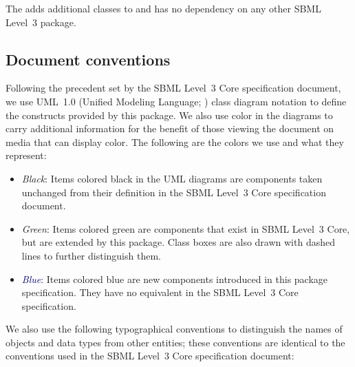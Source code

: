 The \FBCPackage adds additional classes to \sbmlthreecore and has no 
dependency on any other SBML Level~3 package. 


\subsection{Document conventions} \label{conventions} 

Following the precedent set by the SBML Level~3 Core specification 
document, we use UML~1.0 (Unified Modeling Language; 
\citealt{eriksson:1998,oestereich:1999}) class diagram notation to 
define the constructs provided by this package. We also use color in the 
diagrams to carry additional information for the benefit of those 
viewing the document on media that can display color. The following are 
the colors we use and what they represent: 

\begin{itemize} 

\item[\raisebox{2.75pt}{\colorbox{black}{\rule{0.8pt}{0.8pt}}}] 
\emph{Black}: Items colored black in the UML diagrams are components 
taken unchanged from their definition in the SBML Level~3 Core 
specification document. 

\item[\raisebox{2.75pt}{\colorbox{mediumgreen}{\rule{0.8pt}{0.8pt}}}] 
\emph{\textcolor{mediumgreen}{Green}}: Items colored green are 
components that exist in SBML Level~3 Core, but are extended by this 
package. Class boxes are also drawn with dashed lines to further 
distinguish them. 

\item[\raisebox{2.75pt}{\colorbox{darkblue}{\rule{0.8pt}{0.8pt}}}] 
\emph{\textcolor{darkblue}{Blue}}: Items colored blue are new components 
introduced in this package specification. They have no equivalent in the 
SBML Level~3 Core specification. 

\end{itemize} 

We also use the following typographical conventions to distinguish the 
names of objects and data types from other entities; these conventions 
are identical to the conventions used in the SBML Level~3 Core 
specification document: 

